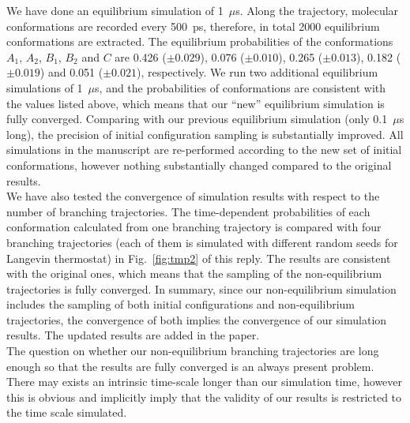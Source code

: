 \documentclass[]{revtex4-1}
\begin{document}
We have done an equilibrium simulation of 1~$\mu$s.  Along the
trajectory, molecular conformations are recorded every 500~ps,
therefore, in total 2000 equilibrium conformations are extracted.  The
equilibrium probabilities of the conformations $A_1$, $A_2$, $B_1$,
$B_2$ and $C$ are 0.426 ($\pm 0.029$), 0.076 ($\pm 0.010$), 0.265
($\pm 0.013$), 0.182 ($\pm 0.019$) and 0.051 ($\pm 0.021$),
respectively.  We run two additional equilibrium simulations of
1~$\mu$s, and the probabilities of conformations are consistent with
the values listed above, which means that our ``new'' equilibrium
simulation is fully converged.  Comparing with our previous
equilibrium simulation (only 0.1~$\mu$s long),
the precision
of initial configuration sampling is substantially improved. All
simulations in the manuscript are re-performed according to the new set
of initial conformations, however nothing substantially changed compared to the original results.\\

We have also tested the convergence of simulation results with respect to the
number of branching trajectories.  The time-dependent probabilities of
each conformation calculated from one branching trajectory is compared
with four branching trajectories (each of them is simulated with
different random seeds for Langevin thermostat) in
Fig.~\ref{fig:tmp2} of this reply. The results are consistent with the original ones, which means that the
sampling of the non-equilibrium trajectories is fully converged. In
summary, since our non-equilibrium simulation includes the
sampling of both initial configurations and non-equilibrium
trajectories, the convergence of both  implies the convergence
of our simulation results. 
The updated results are added in the paper.\\

The question on whether our non-equilibrium branching trajectories are
long enough so that the results are fully converged is an always present problem. There may exists an intrinsic time-scale longer than our simulation time, however this is obvious and implicitly imply that the validity of our results is restricted to the time scale simulated. 
\\
\end{document}
